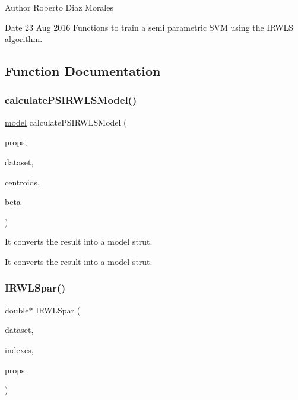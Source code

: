 \begin{DoxyAuthor}{Author}
Roberto Diaz Morales 
\end{DoxyAuthor}
\begin{DoxyDate}{Date}
23 Aug 2016 Functions to train a semi parametric S\+VM using the I\+R\+W\+LS algorithm. 
\end{DoxyDate}


\subsection{Function Documentation}
\hypertarget{PSIRWLS-train_8h_a71b4329438bbf3210414315619f7b804}{}\label{PSIRWLS-train_8h_a71b4329438bbf3210414315619f7b804} 
\subsubsection{\texorpdfstring{calculate\+P\+S\+I\+R\+W\+L\+S\+Model()}{calculatePSIRWLSModel()}}
{\ttfamily \hyperlink{structmodel}{model} calculate\+P\+S\+I\+R\+W\+L\+S\+Model (\begin{DoxyParamCaption}\item[{\hyperlink{structproperties}{properties}}]{props,  }\item[{\hyperlink{structsvm__dataset}{svm\+\_\+dataset}}]{dataset,  }\item[{int $\ast$}]{centroids,  }\item[{double $\ast$}]{beta }\end{DoxyParamCaption})}



It converts the result into a model strut. 

It converts the result into a model strut. \hypertarget{PSIRWLS-train_8h_ad51d9a46645ad0b0bedb1113a3807d24}{}\label{PSIRWLS-train_8h_ad51d9a46645ad0b0bedb1113a3807d24} 
\subsubsection{\texorpdfstring{I\+R\+W\+L\+Spar()}{IRWLSpar()}}
{\ttfamily double$\ast$ I\+R\+W\+L\+Spar (\begin{DoxyParamCaption}\item[{\hyperlink{structsvm__dataset}{svm\+\_\+dataset}}]{dataset,  }\item[{int $\ast$}]{indexes,  }\item[{\hyperlink{structproperties}{properties}}]{props }\end{DoxyParamCaption})}



